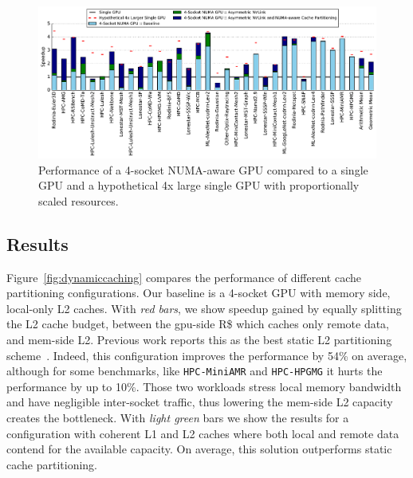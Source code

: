 \begin{figure}[tp]
    \centering
    \includegraphics[width=1.0\textwidth]{figures/plot_final_speedup_WB_nvlink_first.pdf}
    \caption{Performance of a 4-socket NUMA-aware GPU compared to a single GPU and a hypothetical 4x large single GPU with proportionally scaled resources.}
    \label{fig:combined}
    \vspace{-.2in}
\end{figure}

\subsection{Results}

Figure~\ref{fig:dynamiccaching} compares the performance of different cache 
partitioning configurations. Our baseline is a 4-socket GPU with memory side, 
local-only L2 caches. With \emph{red bars}, we show speedup gained by equally 
splitting the L2 cache budget, between the gpu-side R\$ which caches only 
remote data, and mem-side L2. Previous work reports this as the best static 
L2 partitioning scheme~\cite{Arunkumar2017}. Indeed, this configuration 
improves the performance by 54\% on average, although for some benchmarks, 
like \texttt{HPC-MiniAMR} and \texttt{HPC-HPGMG} it hurts the performance by 
up to 10\%. Those two workloads stress local memory bandwidth and have negligible 
inter-socket traffic, thus lowering the mem-side L2 capacity creates the 
bottleneck. With \emph{light green} bars we show the results for a configuration with 
coherent L1 and L2 caches where both local and remote data contend for the 
available capacity. On average, this solution outperforms static cache 
partitioning.

